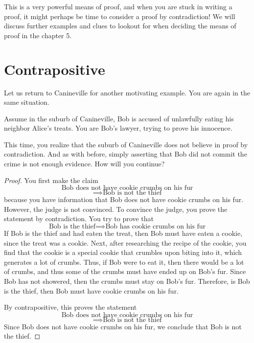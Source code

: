 This is a very powerful means of proof, and when you are stuck in writing a proof, it might perhaps be time to consider a proof by contradiction! We will discuss further examples and clues to lookout for when deciding the means of proof in the chapter 5.










\section{Contrapositive}
Let us return to Canineville for another motivating example. You are again in the same situation. 

\begin{example}
Assume in the suburb of Canineville, Bob is accused of unlawfully eating his neighbor Alice's treats. You are Bob's lawyer, trying to prove his innocence. 
\end{example}

This time, you realize that the suburb of Canineville does not believe in proof by contradiction. And as with before, simply asserting that Bob did not commit the crime is not enough evidence. How will you continue?

\begin{proof}
You first make the claim
\[
\text{Bob does not have cookie crumbs on his fur} 
\]
\[
\implies \text{Bob is not the thief}
\]
because you have information that Bob does not have cookie crumbs on his fur. However, the judge is not convinced. To convince the judge, you prove the statement by contradiction. You try to prove that 
\[
\text{Bob is the thief} \implies \text{Bob has cookie crumbs on his fur}
\]
If Bob is the thief and had eaten the treat, then Bob must have eaten a cookie, since the treat was a cookie. Next, after researching the recipe of the cookie, you find that the cookie is a special cookie that crumbles upon biting into it, which generates a lot of crumbs. Thus, if Bob were to eat it, then there would be a lot of crumbs, and thus some of the crumbs must have ended up on Bob's fur. Since Bob has not showered, then the crumbs must stay on Bob's fur. Therefore, is Bob is the thief, then Bob must have cookie crumbs on his fur. 

By contrapositive, this proves the statement
\[
\text{Bob does not have cookie crumbs on his fur} 
\]
\[
\implies \text{Bob is not the thief}
\]
Since Bob does not have cookie crumbs on his fur, we conclude that Bob is not the thief.
\end{proof}

